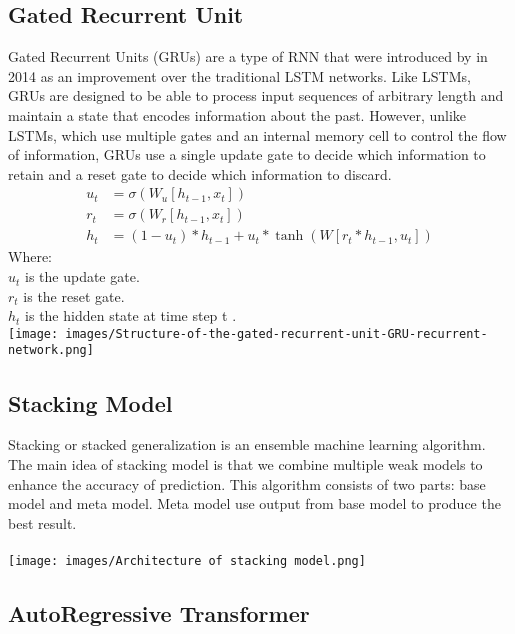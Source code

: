 \documentclass{ieeeojies}
\begin{document}
\subsection{Gated Recurrent Unit}
Gated Recurrent Units (GRUs) are a type of RNN that were introduced by in 2014 as an improvement over the traditional LSTM networks. Like LSTMs, GRUs are designed to be able to process input sequences of arbitrary length and maintain a state that encodes information about the past. However, unlike LSTMs, which use multiple gates and an internal memory cell to control the flow of information, GRUs use a single update gate to decide which information to retain and a reset gate to decide which information to discard.
\begin{align*}
    u_t &= \sigma(W_u [h_{t-1}, x_t]) \\
    r_t &= \sigma(W_r [h_{t-1}, x_t]) \\
    h_t &= (1 - u_t) \ast h_{t-1} + u_t \ast \tanh(W [r_t \ast h_{t-1}, u_t])
\end{align*}
Where: \\
\indent \textbullet \(u_t\) is the update gate.\\
\indent \textbullet \(r_t\) is the reset gate.\\
\indent \textbullet \(h_t\) is the hidden state at time step t .\\
\texttt{[image: images/Structure-of-the-gated-recurrent-unit-GRU-recurrent-network.png]}
\subsection{Stacking Model}
Stacking or stacked generalization is an ensemble machine learning algorithm. The main idea of stacking model is that we combine multiple weak models to enhance the accuracy of prediction. This algorithm consists of two parts: base model and meta model. Meta model use output from base model to produce the best result.\\ \\
\texttt{[image: images/Architecture of stacking model.png]}
\subsection{AutoRegressive Transformer}
\end{document}
